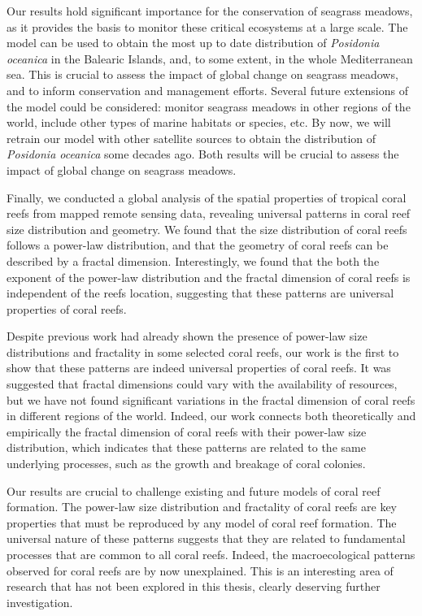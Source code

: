 Our results hold significant importance for the conservation of seagrass
meadows, as it provides the basis to monitor these critical ecosystems at a
large scale. The model can be used to obtain the most up to date distribution
of \textit{Posidonia oceanica} in the Balearic Islands, and, to some extent, in
the whole Mediterranean sea. This is crucial to assess the impact of global
change on seagrass meadows, and to inform conservation and management efforts.
Several future extensions of the model could be considered:
monitor seagrass meadows in other regions of the world, include other types of
marine habitats or species, etc. By now, we will retrain our model with other
satellite sources to obtain the distribution of \textit{Posidonia oceanica}
some decades ago. Both results will be crucial to assess the impact of global
change on seagrass meadows.

Finally, we conducted a global analysis of the spatial properties of tropical
coral reefs from mapped remote sensing data, revealing universal patterns in
coral reef size distribution and geometry. We found that the size distribution
of coral reefs follows a power-law distribution, and that the geometry of coral
reefs can be described by a fractal dimension. Interestingly, we found that the
both the exponent of the power-law distribution and the fractal dimension of
coral reefs is independent of the reefs location, suggesting that these
patterns are universal properties of coral reefs.

Despite previous work had already shown the presence of power-law size
distributions and fractality in some selected coral reefs, our work is the
first to show that these patterns are indeed universal properties of coral
reefs. It was suggested that fractal dimensions could vary with the
availability of resources, but we have not found significant variations in the
fractal dimension of coral reefs in different regions of the world. Indeed, our
work connects both theoretically and empirically the fractal dimension of coral
reefs with their power-law size distribution, which indicates that these
patterns are related to the same underlying processes, such as the growth and
breakage of coral colonies.

Our results are crucial to challenge existing and future models of coral reef
formation. The power-law size distribution and fractality of coral reefs are
key properties that must be reproduced by any model of coral reef formation.
The universal nature of these patterns suggests that they are related to
fundamental processes that are common to all coral reefs. Indeed, the
macroecological patterns observed for coral reefs are by now unexplained. This
is an interesting area of research that has not been explored in this thesis,
clearly deserving further investigation.